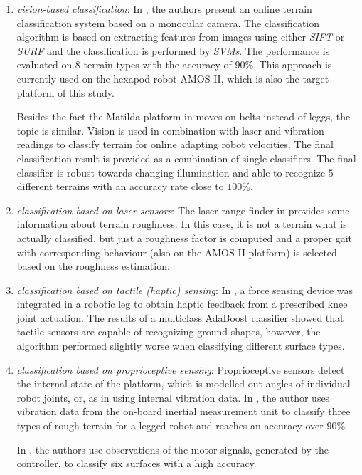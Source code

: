 \begin{enumerate}
\item \textit{vision-based classification}: In \citep{article:01:visual}, the authors present an online terrain classification system based on a monocular camera. The classification algorithm is based on extracting features from images using either \textit{SIFT} or \textit{SURF} and the classification is performed by \textit{SVMs}. The performance is evaluated on $ 8 $ terrain types with the accuracy of $ 90\% $. This approach is currently used on the hexapod robot AMOS II, which is also the target platform of this study.

Besides the fact the Matilda platform in \citep{article:04:onlinelearning} moves on belts instead of leggs, the topic is similar. Vision is used in combination with laser and vibration readings to classify terrain for online adapting robot velocities. The final classification result is provided as a combination of single classifiers. The final classifier is robust towards changing illumination and able to recognize $ 5 $ different terrains with an accuracy rate close to $ 100\% $.

\item \textit{classification based on laser sensors}: The laser range finder in \citep{article:02:laser} provides some information about terrain roughness. In this case, it is not a terrain what is actually classified, but just a roughness factor is computed and a proper gait with corresponding behaviour (also on the AMOS II platform) is selected based on the roughness estimation.

\item \textit{classification based on tactile (haptic) sensing}: In \citep{article:06:haptic}, a force sensing device was integrated in a robotic leg to obtain haptic feedback from a prescribed knee joint actuation. The results of a multiclass AdaBoost classifier showed that tactile sensors are capable of recognizing ground shapes, however, the algorithm performed slightly worse when classifying different surface types.

\item \textit{classification based on proprioceptive sensing}: \citep{thesis:05:proprioception} Proprioceptive sensors detect the internal state of the platform, which is modelled out angles of individual robot joints, or, as in \citep{article:08:rhex} using internal vibration data. In \citep{article:09:roughterrain}, the author uses vibration data from the on-board inertial measurement unit to classify three types of rough terrain for a legged robot and reaches an accuracy over $ 90\% $.

In \citep{article:03:motorsignals}, the authors use observations of the motor signals, generated by the controller, to classify six surfaces with a high accuracy.
\end{enumerate} 

